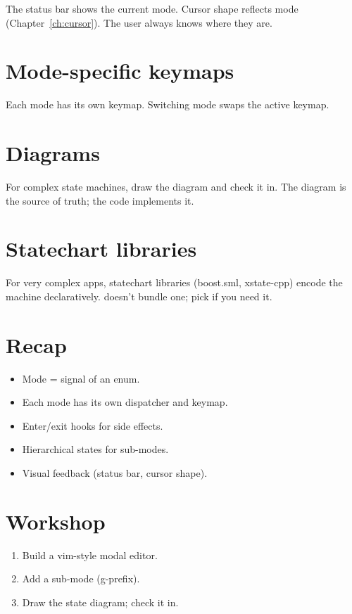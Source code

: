 The status bar shows the current mode. Cursor shape
reflects mode (Chapter~\ref{ch:cursor}). The user always
knows where they are.

\section{Mode-specific keymaps}

Each mode has its own keymap. Switching mode swaps the
active keymap.

\section{Diagrams}

For complex state machines, draw the diagram and check
it in. The diagram is the source of truth; the code
implements it.

\section{Statechart libraries}

For very complex apps, statechart libraries (boost.sml,
xstate-cpp) encode the machine declaratively. \maya{}
doesn't bundle one; pick if you need it.

\section{Recap}

\begin{recap}
\begin{itemize}[leftmargin=*]
  \item Mode = signal of an enum.
  \item Each mode has its own dispatcher and keymap.
  \item Enter/exit hooks for side effects.
  \item Hierarchical states for sub-modes.
  \item Visual feedback (status bar, cursor shape).
\end{itemize}
\end{recap}

\section*{Workshop}

\begin{enumerate}[leftmargin=*]
  \item Build a vim-style modal editor.
  \item Add a sub-mode (g-prefix).
  \item Draw the state diagram; check it in.
\end{enumerate}
